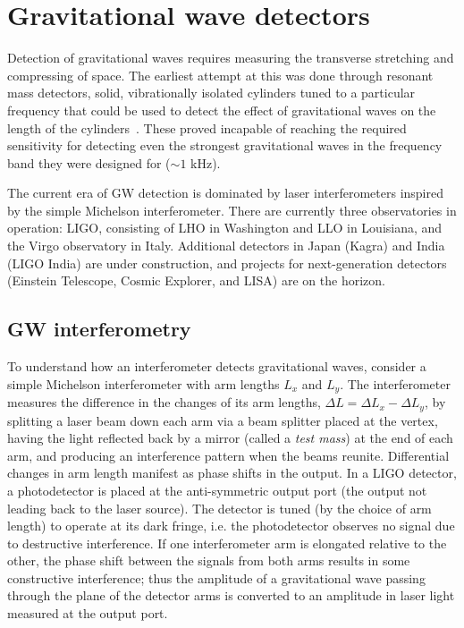 \chapter{Gravitational wave detectors}\label{ch:detectors}

Detection of gravitational waves requires measuring the transverse stretching and compressing of space. The earliest attempt at this was done through resonant mass detectors, solid, vibrationally isolated cylinders tuned to a particular frequency that could be used to detect the effect of gravitational waves on the length of the cylinders~\citep{Weber_1968}. These proved incapable of reaching the required sensitivity for detecting even the strongest gravitational waves in the frequency band they were designed for ($\sim1$ kHz).

The current era of \ac{GW} detection is dominated by laser interferometers inspired by the simple Michelson interferometer. There are currently three observatories in operation: \ac{LIGO}, consisting of \ac{LHO} in Washington and \ac{LLO} in Louisiana, and the Virgo observatory in Italy. Additional detectors in Japan (Kagra) and India (\ac{LIGO} India) are under construction, and projects for next-generation detectors (Einstein Telescope, Cosmic Explorer, and \ac{LISA}) are on the horizon.


\section{GW interferometry}


To understand how an interferometer detects gravitational waves, consider a simple Michelson interferometer with arm lengths $L_x$ and $L_y$.
The interferometer measures the difference in the changes of its arm lengths, $\Delta L = \Delta L_x - \Delta L_y$, by splitting a laser beam down each arm via a beam splitter placed at the vertex, having the light reflected back by a mirror (called a \textit{test mass}) at the end of each arm, and producing an interference pattern when the beams reunite.
Differential changes in arm length manifest as phase shifts in the output.
In a LIGO detector, a photodetector is placed at the anti-symmetric output port (the output not leading back to the laser source).
The detector is tuned (by the choice of arm length) to operate at its dark fringe, i.e. the photodetector observes no signal due to destructive interference.
If one interferometer arm is elongated relative to the other, the phase shift between the signals from both arms results in some constructive interference; thus the amplitude of a gravitational wave passing through the plane of the detector arms is converted to an amplitude in laser light measured at the output port.

